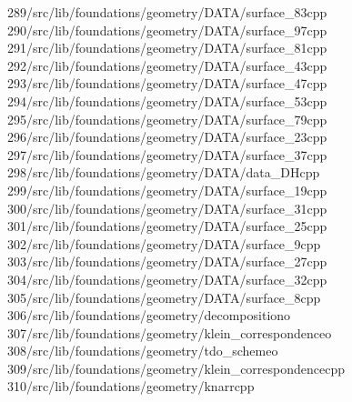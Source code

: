 \begin{tabbing}
289\>/src/lib/foundations/geometry/DATA/surface\_83cpp\\[0pt]
290\>/src/lib/foundations/geometry/DATA/surface\_97cpp\\[0pt]
291\>/src/lib/foundations/geometry/DATA/surface\_81cpp\\[0pt]
292\>/src/lib/foundations/geometry/DATA/surface\_43cpp\\[0pt]
293\>/src/lib/foundations/geometry/DATA/surface\_47cpp\\[0pt]
294\>/src/lib/foundations/geometry/DATA/surface\_53cpp\\[0pt]
295\>/src/lib/foundations/geometry/DATA/surface\_79cpp\\[0pt]
296\>/src/lib/foundations/geometry/DATA/surface\_23cpp\\[0pt]
297\>/src/lib/foundations/geometry/DATA/surface\_37cpp\\[0pt]
298\>/src/lib/foundations/geometry/DATA/data\_DHcpp\\[0pt]
299\>/src/lib/foundations/geometry/DATA/surface\_19cpp\\[0pt]
300\>/src/lib/foundations/geometry/DATA/surface\_31cpp\\[0pt]
301\>/src/lib/foundations/geometry/DATA/surface\_25cpp\\[0pt]
302\>/src/lib/foundations/geometry/DATA/surface\_9cpp\\[0pt]
303\>/src/lib/foundations/geometry/DATA/surface\_27cpp\\[0pt]
304\>/src/lib/foundations/geometry/DATA/surface\_32cpp\\[0pt]
305\>/src/lib/foundations/geometry/DATA/surface\_8cpp\\[0pt]
306\>/src/lib/foundations/geometry/decompositiono\\[0pt]
307\>/src/lib/foundations/geometry/klein\_correspondenceo\\[0pt]
308\>/src/lib/foundations/geometry/tdo\_schemeo\\[0pt]
309\>/src/lib/foundations/geometry/klein\_correspondencecpp\\[0pt]
310\>/src/lib/foundations/geometry/knarrcpp\\[0pt]

\end{tabbing}
